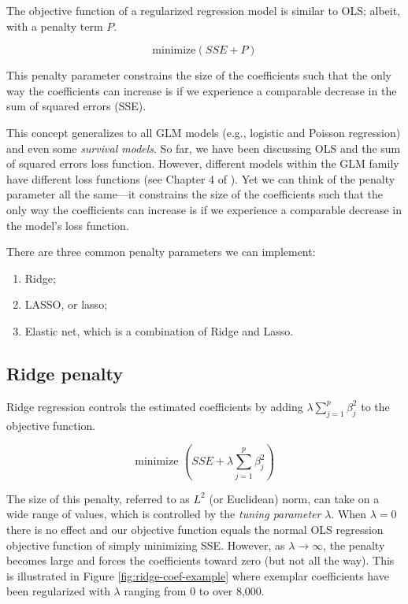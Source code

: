 \documentclass[]{krantz}
\providecommand{\tightlist}{%
  \setlength{\itemsep}{0pt}\setlength{\parskip}{0pt}}
\begin{document}
The objective function of a regularized regression model is similar to OLS; albeit, with a penalty term \(P\).

\begin{equation}
\label{eq:penalty}
\text{minimize} \left( SSE + P \right)
\end{equation}

This penalty parameter constrains the size of the coefficients such that the only way the coefficients can increase is if we experience a comparable decrease in the sum of squared errors (SSE).

This concept generalizes to all GLM models (e.g., logistic and Poisson regression) and even some \emph{survival models}. So far, we have been discussing OLS and the sum of squared errors loss function. However, different models within the GLM family have different loss functions (see Chapter 4 of \citet{esl}). Yet we can think of the penalty parameter all the same---it constrains the size of the coefficients such that the only way the coefficients can increase is if we experience a comparable decrease in the model's loss function.

There are three common penalty parameters we can implement:

\begin{enumerate}
\def\labelenumi{\arabic{enumi}.}
\tightlist
\item
  Ridge;
\item
  LASSO, or lasso;
\item
  Elastic net, which is a combination of Ridge and Lasso.
\end{enumerate}

\hypertarget{ridge}{%
\subsection{Ridge penalty}\label{ridge}}

Ridge regression \citep{hoerl1970ridge} controls the estimated coefficients by adding \(\lambda \sum^p_{j=1} \beta_j^2\) to the objective function.

\begin{equation}
\label{eq:ridge-penalty}
\text{minimize } \left( SSE + \lambda \sum^p_{j=1} \beta_j^2 \right)
\end{equation}

The size of this penalty, referred to as \(L^2\) (or Euclidean) norm, can take on a wide range of values, which is controlled by the \emph{tuning parameter} \(\lambda\). When \(\lambda = 0\) there is no effect and our objective function equals the normal OLS regression objective function of simply minimizing SSE. However, as \(\lambda \rightarrow \infty\), the penalty becomes large and forces the coefficients toward zero (but not all the way). This is illustrated in Figure \ref{fig:ridge-coef-example} where exemplar coefficients have been regularized with \(\lambda\) ranging from 0 to over 8,000.
\end{document}
